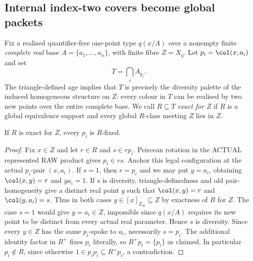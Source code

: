 \subsection{Internal index-two covers become global packets}

Fix a realised quantifier-free one-point type $q(x/A)$ over a nonempty
finite \emph{complete real} base $A=\{a_1,\dots,a_n\}$, with finite
fibre $Z=X_q$. Let $p_i=\col(x,a_i)$ and set
\[
 T=\bigcap_i A_{p_i}.
\]
The triangle-defined age implies that $T$ is precisely the diversity
palette of the induced homogeneous structure on $Z$: every colour in
$T$ can be realised by two new points over the entire complete base.
We call $R\subseteq T$ \emph{exact for $Z$} if $R$ is a global
equivalence support and every global $R$-class meeting $Z$ lies in $Z$.

\begin{lemma}\label{lem:rh-spokefixed}
If $R$ is exact for $Z$, every $p_i$ is $R$-fixed.
\end{lemma}
\begin{proof}
Fix $x\in Z$ and let $r\in R$ and $s\in rp_i$.
Peircean rotation in the ACTUAL represented RAW product gives
$p_i\in rs$.  Anchor this legal configuration at the actual
$p_i$-pair $(x,a_i)$.  If $s=1$, then $r=p_i$ and we may
put $y=a_i$, obtaining $\col(x,y)=r$ and $ya_i=1$.
If $s$ is diversity, triangle-definedness and old
pair-homogeneity give a distinct real point $y$ such that
$\col(x,y)=r$ and $\col(y,a_i)=s$.  Thus in both cases
$y\in[x]_{E_R}\subseteq Z$ by exactness of $R$ for $Z$.
The case $s=1$ would give $y=a_i\in Z$, impossible since
$q(x/A)$ requires its new point to be distinct from every
actual real parameter.  Hence $s$ is diversity.
Since every $y\in Z$ has the same $p_i$-spoke
to $a_i$, necessarily $s=p_i$. The additional
identity factor in $R^+$ fixes $p_i$ literally,
so $R^+p_i=\{p_i\}$ as claimed.
In particular $p_i\notin R$, since otherwise
$1\in p_ip_i\subseteq R^+p_i$, a contradiction.
\end{proof}

